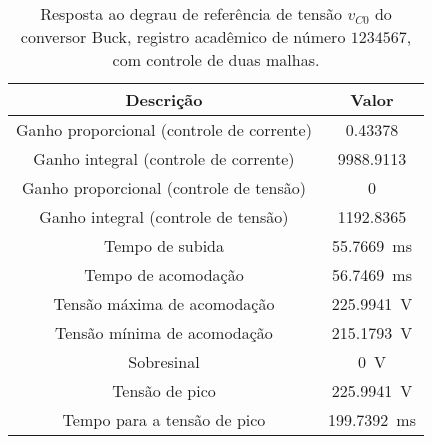 \begin{table}[!ht]
\centering
\caption{Resposta ao degrau de referência de tensão $v_{C0}$ do conversor Buck, registro acadêmico de número $1234567$, com controle de duas malhas.}
\label{tab:resposta2malhas}
\begin{tabular}{@{}cc@{}}
\toprule
\textbf{Descrição} & \textbf{Valor}\\ \midrule
Ganho proporcional (controle de corrente) & \SI{0.43378}{}\\
Ganho integral (controle de corrente) & \SI{9988.9113}{}\\
Ganho proporcional (controle de tensão) & \SI{0}{}\\
Ganho integral (controle de tensão) & \SI{1192.8365}{}\\
Tempo de subida & \SI{55.7669}{\milli\s}\\
Tempo de acomodação & \SI{56.7469}{\milli\s}\\
Tensão máxima de acomodação & \SI{225.9941}{\V}\\
Tensão mínima de acomodação & \SI{215.1793}{\V}\\
Sobresinal & \SI{0}{\V}\\
Tensão de pico & \SI{225.9941}{\V}\\
Tempo para a tensão de pico & \SI{199.7392}{\milli\s}\\
\bottomrule
\end{tabular}
\end{table}

